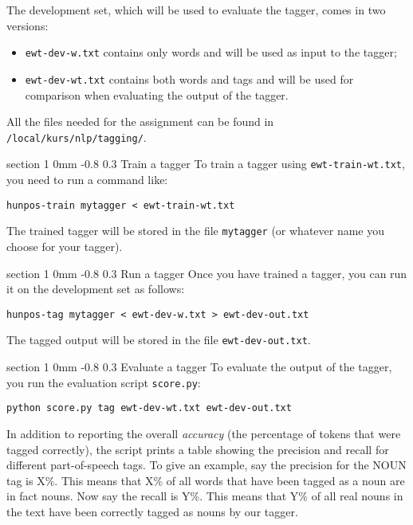 \documentclass[11pt]{article}
\makeatletter
\newcommand{\newsec}[2]{\section{#1}\label{sec:#2}\noindent}
\renewcommand{\section}{\@startsection
{section}%
{1}%
{0mm}%
{-0.8\baselineskip}%
{0.3\baselineskip}%
{\bfseries\large}}%
\makeatother
\begin{document}
        The development set, which will be used to evaluate the tagger, comes in two versions:
\begin{itemize}[noitemsep,topsep=3pt]
\item {\tt ewt-dev-w.txt} contains only words and will be used as input to the tagger;
\item {\tt ewt-dev-wt.txt} contains both words and tags and will be
        used for comparison when evaluating the output of the tagger.
\end{itemize}
        All the files needed for the assignment can be found in {\tt
          /local/kurs/nlp/tagging/}.

        \newsec{Train a tagger}{train}%
        To train a tagger using {\tt ewt-train-wt.txt}, you need to
        run a command like:
\begin{verbatim}
hunpos-train mytagger < ewt-train-wt.txt
\end{verbatim}
The trained tagger will be stored in the file {\tt mytagger} (or
whatever name you choose for your tagger).

\newsec{Run a tagger}{run}%
Once you have trained a tagger, you can run it on the development set
as follows:
\begin{verbatim}
hunpos-tag mytagger < ewt-dev-w.txt > ewt-dev-out.txt
\end{verbatim}
The tagged output will be stored in the file {\tt ewt-dev-out.txt}.

\newsec{Evaluate a tagger}{eval}%
To evaluate the output of the tagger, you run the evaluation script
{\tt score.py}:
\begin{verbatim}
python score.py tag ewt-dev-wt.txt ewt-dev-out.txt
\end{verbatim}
In addition to reporting the overall \emph{accuracy} (the percentage
of tokens that were tagged correctly), the script prints a table
showing the precision and recall for different part-of-speech tags. To
give an example, say the precision for the NOUN tag is X\%. This means
that X\% of all words that have been tagged as a noun are in fact
nouns. Now say the recall is Y\%. This means that Y\% of all real
nouns in the text have been correctly tagged as nouns by our tagger.
\end{document}
